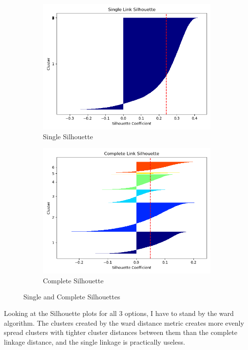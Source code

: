 \documentclass[12pt]{article}
\begin{document}
\begin{figure}
    \begin{subfigure}{.5\textwidth}
        \includegraphics[width=.95\textwidth]{../results/agglo/Silhouette_Plot_single.png}
        \caption{Single Silhouette}
        \end{subfigure}%
      \begin{subfigure}{.5\textwidth}
        \includegraphics[width=.95\textwidth]{../results/agglo/Silhouette_Plot_complete.png}
        \caption{Complete Silhouette}
      \end{subfigure}
  \caption{Single and Complete Silhouettes}
\label{figure7}
\end{figure}

Looking at the Silhouette plots for all 3 options, I have to stand by the ward algorithm. The clusters created by the
ward distance metric creates more evenly spread clusters with tighter cluster distances between them than the complete 
linkage distance, and the single linkage is practically useless.
\end{document}
